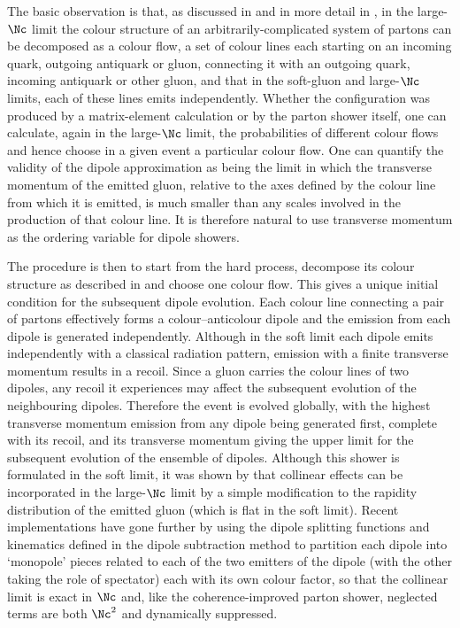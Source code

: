 The basic observation is that, as discussed in
 and in more detail in
, in the large-$\Nc$ limit the
colour structure of an arbitrarily-complicated system of partons can be
decomposed as a colour flow, \ie a set of colour lines each starting on an
incoming quark, outgoing antiquark or gluon, connecting it with an
outgoing quark, incoming antiquark or other gluon, and that in the
soft-gluon and large-$\Nc$ limits, each of these lines emits
independently.  Whether the configuration was produced by a
matrix-element calculation or by the parton shower itself, one can
calculate, again in the large-$\Nc$ limit, the probabilities of
different colour flows and hence choose in a given event a particular
colour flow.  One can quantify the validity of the dipole approximation
as being the limit in which the transverse momentum of the emitted
gluon, relative to the axes defined by the colour line from which it is
emitted, is much smaller than any scales involved in the production of
that colour line.  It is therefore natural to use transverse momentum as
the ordering variable for dipole showers.

The procedure is then to start from the hard process, decompose its
colour structure as described in
 and choose one colour flow.
This gives a unique initial condition for the subsequent dipole
evolution.  Each colour line connecting a pair of partons effectively
forms a colour--anticolour dipole and the emission from each dipole is
generated independently.  Although in the soft limit each dipole emits
independently with a classical radiation pattern, emission with a finite
transverse momentum results in a recoil.  Since a gluon carries the
colour lines of two dipoles, any recoil it experiences may affect the
subsequent evolution of the neighbouring dipoles.  Therefore the event
is evolved globally, with the highest transverse momentum emission from
any dipole being generated first, complete with its recoil, and its
transverse momentum giving the upper limit for the subsequent evolution
of the ensemble of dipoles.  Although this shower is formulated in the
soft limit, it was shown by \cite{Gustafson:1987rq} that
collinear effects can be incorporated in the large-$\Nc$ limit by a
simple modification to the rapidity distribution of the emitted gluon
(which is flat in the soft limit).  Recent implementations have gone
further by using the dipole splitting functions and kinematics defined
in the dipole subtraction method \cite{Catani:1996vz} to partition each dipole
into `monopole' pieces related to each of the two emitters of the dipole
(with the other taking the role of spectator) each with its own colour
factor, so that the collinear limit is exact in $\Nc$ and, like the
coherence-improved parton shower, neglected terms are both $\Nc^2$ and
dynamically suppressed.


